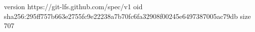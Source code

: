 version https://git-lfs.github.com/spec/v1
oid sha256:295ff757b663e2755fc9e22238a7b70fc6fa32908f00245e6497387005ac79db
size 707
